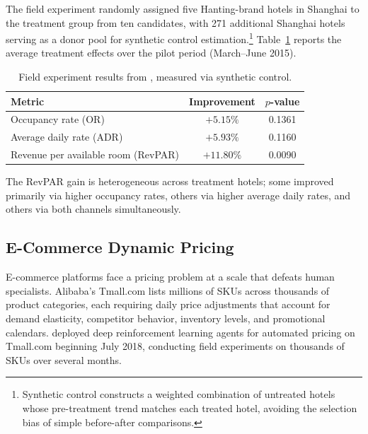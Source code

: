 The field experiment randomly assigned five Hanting-brand hotels in Shanghai to the treatment group from ten candidates, with 271 additional Shanghai hotels serving as a donor pool for synthetic control estimation.\footnote{Synthetic control constructs a weighted combination of untreated hotels whose pre-treatment trend matches each treated hotel, avoiding the selection bias of simple before-after comparisons.} Table~\ref{tab:hotel_results} reports the average treatment effects over the pilot period (March--June 2015).

\begin{table}[htbp]
\centering
\caption{Field experiment results from \citet{Chen2023hotelrl}, measured via synthetic control.}
\label{tab:hotel_results}
\begin{tabular}{lcc}
\toprule
Metric & Improvement & $p$-value \\
\midrule
Occupancy rate (OR) & $+5.15\%$ & 0.1361 \\
Average daily rate (ADR) & $+5.93\%$ & 0.1160 \\
Revenue per available room (RevPAR) & $+11.80\%$ & 0.0090 \\
\bottomrule
\end{tabular}
\end{table}

The RevPAR gain is heterogeneous across treatment hotels; some improved primarily via higher occupancy rates, others via higher average daily rates, and others via both channels simultaneously.


\subsection{E-Commerce Dynamic Pricing}
\label{sec:ecommerce_pricing}

E-commerce platforms face a pricing problem at a scale that defeats human specialists. Alibaba's Tmall.com lists millions of SKUs across thousands of product categories, each requiring daily price adjustments that account for demand elasticity, competitor behavior, inventory levels, and promotional calendars. \citet{Liu2019} deployed deep reinforcement learning agents for automated pricing on Tmall.com beginning July 2018, conducting field experiments on thousands of SKUs over several months.

